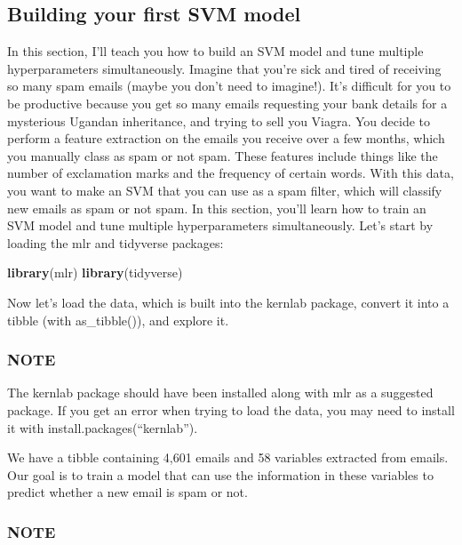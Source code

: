 \documentclass[
]{article}
\newenvironment{Shaded}{\begin{snugshade}}{\end{snugshade}}
\newcommand{\FunctionTok}[1]{\textcolor[rgb]{0.13,0.29,0.53}{\textbf{#1}}}
\newcommand{\NormalTok}[1]{#1}
\begin{document}
\subsection{Building your first SVM
model}\label{building-your-first-svm-model}

In this section, I'll teach you how to build an SVM model and tune
multiple hyperparameters simultaneously. Imagine that you're sick and
tired of receiving so many spam emails (maybe you don't need to
imagine!). It's difficult for you to be productive because you get so
many emails requesting your bank details for a mysterious Ugandan
inheritance, and trying to sell you Viagra. You decide to perform a
feature extraction on the emails you receive over a few months, which
you manually class as spam or not spam. These features include things
like the number of exclamation marks and the frequency of certain words.
With this data, you want to make an SVM that you can use as a spam
filter, which will classify new emails as spam or not spam. In this
section, you'll learn how to train an SVM model and tune multiple
hyperparameters simultaneously. Let's start by loading the mlr and
tidyverse packages:

\begin{Shaded}
\begin{Highlighting}[]
\FunctionTok{library}\NormalTok{(mlr)}
\FunctionTok{library}\NormalTok{(tidyverse)}
\end{Highlighting}
\end{Shaded}

Now let's load the data, which is built into the kernlab package,
convert it into a tibble (with as\_tibble()), and explore it.

\subsubsection{NOTE}\label{note-15}

The kernlab package should have been installed along with mlr as a
suggested package. If you get an error when trying to load the data, you
may need to install it with install.packages(``kernlab'').

We have a tibble containing 4,601 emails and 58 variables extracted from
emails. Our goal is to train a model that can use the information in
these variables to predict whether a new email is spam or not.

\subsubsection{NOTE}\label{note-16}
\end{document}
